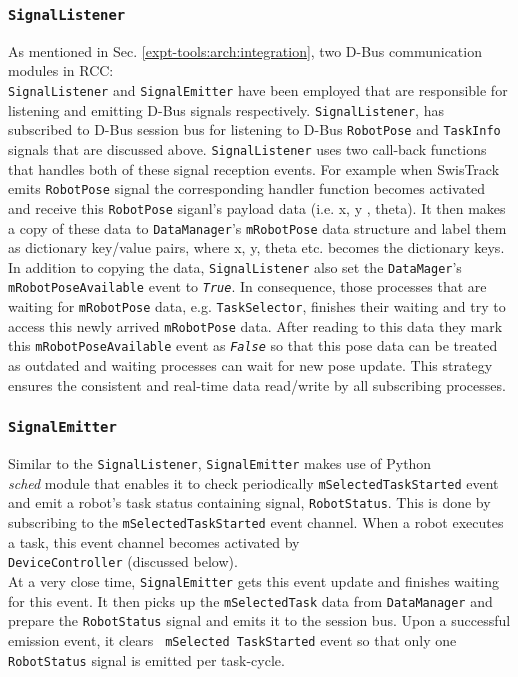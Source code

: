 \subsubsection*{\texttt{SignalListener}}
As mentioned in Sec. \ref{expt-tools:arch:integration}, two D-Bus communication modules in RCC:\\ \texttt{SignalListener} and \texttt{SignalEmitter} have been employed that are responsible for listening and emitting D-Bus signals respectively. \texttt{SignalListener}, has subscribed to D-Bus session bus for listening  to D-Bus \texttt{RobotPose} and \texttt{TaskInfo} signals that are discussed above. \texttt{SignalListener} uses two call-back functions that handles both of these signal reception events. For example when SwisTrack emits \texttt{RobotPose} signal  the corresponding handler function becomes activated and receive this \texttt{RobotPose} siganl's payload data (i.e. x, y , theta). It then makes a copy of these data  to \texttt{DataManager}'s \texttt{mRobotPose} data structure and label them as dictionary key/value pairs, where x, y, theta etc. becomes the dictionary keys. In addition to copying the data, \texttt{SignalListener} also set the \texttt{DataMager}'s   \texttt{mRobotPoseAvailable} event to {\em \texttt{True}}. In consequence, those processes that are waiting for \texttt{mRobotPose} data, e.g. \texttt{TaskSelector}, finishes their waiting and try to access this newly arrived \texttt{mRobotPose} data. After reading to this data they mark this \texttt{mRobotPoseAvailable} event as  {\em \texttt{False}} so that this pose data can be treated as outdated and waiting processes can wait for new pose update. This strategy ensures the consistent and real-time data read/write by all subscribing processes.
\subsubsection*{\texttt{SignalEmitter}}
Similar to the \texttt{SignalListener}, \texttt{SignalEmitter} makes use of Python\\ {\em sched} module that enables it to check periodically \texttt{mSelectedTaskStarted} event and emit a robot's task status containing signal, \texttt{RobotStatus}.  This is done by subscribing to the  \texttt{mSelectedTaskStarted} event channel. When a robot executes a task, this event channel becomes  activated by\\ \texttt{DeviceController} (discussed below).\\ At a very close time, \texttt{SignalEmitter} gets this event update and finishes waiting for this event. It then picks up the \texttt{mSelectedTask} data from \texttt{DataManager} and prepare the \texttt{RobotStatus} signal and emits it to the session bus. Upon a successful emission event, it clears \texttt{ mSelected TaskStarted} event so that only one \texttt{RobotStatus}  signal is emitted per task-cycle.

